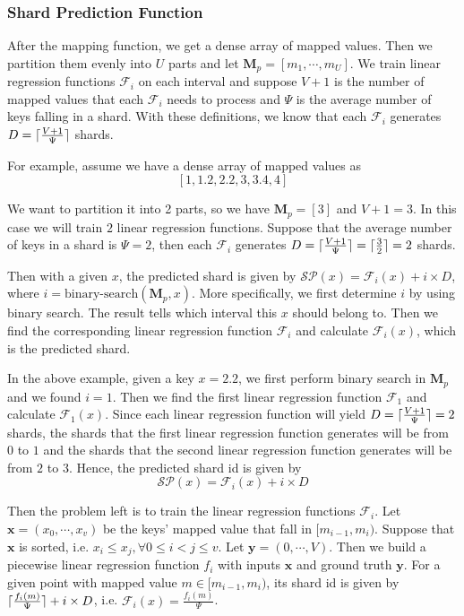 \subsubsection{Shard Prediction Function}

After the mapping function, we get a dense array of mapped values. Then we partition them evenly into $U$ parts and let $\boldsymbol{M}_p=[m_1,\cdots, m_U]$. We train linear regression functions $\mathcal{F}_i$ on each interval and suppose $V+1$ is the number of mapped values that each $\mathcal{F}_i$ needs to process and $\Psi$ is the average number of keys falling in a shard. With these definitions, we know that each $\mathcal{F}_i$ generates $D=\lceil\frac{V+1}{\Psi}\rceil$ shards.

\begin{mscexample}
	For example, assume we have a dense array of mapped values as $$[1,1.2,2.2,3,3.4,4]$$ 
	
	We want to partition it into 2 parts, so we have $\boldsymbol{M}_p=[3]$ and $V+1=3$. In this case we will train $2$ linear regression functions. Suppose that the average number of keys in a shard is $\Psi=2$, then each $\mathcal{F}_i$ generates $D=\lceil\frac{V+1}{\Psi}\rceil=\lceil\frac{3}{2}\rceil=2$ shards.
\end{mscexample}


Then with a given $x$, the predicted shard is given by $\mathcal{SP}(x)=\mathcal{F}_i(x)+i\times D$, where $i=\text{binary-search}(\boldsymbol{M}_p,x)$. More specifically, we first determine $i$ by using binary search. The result tells which interval this $x$ should belong to. Then we find the corresponding linear regression function $\mathcal{F}_i$ and calculate $\mathcal{F}_i(x)$, which is the predicted shard.

\begin{mscexample}
	In the above example, given a key $x=2.2$, we first perform binary search in $\boldsymbol{M}_p$ and we found $i=1$. Then we find the first linear regression function $\mathcal{F}_1$ and calculate $\mathcal{F}_1(x)$. Since each linear regression function will yield $D=\lceil\frac{V+1}{\Psi}\rceil=2$ shards, the shards that the first linear regression function generates will be from $0$ to $1$ and the shards that the second linear regression function generates will be from $2$ to $3$. Hence, the predicted shard id is given by 
$$
\mathcal{SP}(x)=\mathcal{F}_i(x)+i\times D
$$
\end{mscexample}

Then the problem left is to train the linear regression functions $\mathcal{F}_i$. Let $\boldsymbol{x}=(x_0,\cdots,x_v)$ be the keys' mapped value that fall in $[m_{i-1}, m_i)$. Suppose that $\boldsymbol{x}$ is sorted, i.e. $x_i\leq x_j, \forall 0\leq i<j\leq v$. Let $\boldsymbol{y}=(0,\cdots, V)$. Then we build a piecewise linear regression function $f_i$ with inputs $\boldsymbol{x}$ and ground truth $\boldsymbol{y}$. For a given point with mapped value $m\in[m_{i-1}, m_i)$, its shard id is given by $\lceil\frac{f_i(m)}{\Psi}\rceil+i\times D$, i.e. $\mathcal{F}_i(x)=\frac{f_i(m)}{\Psi}$.

